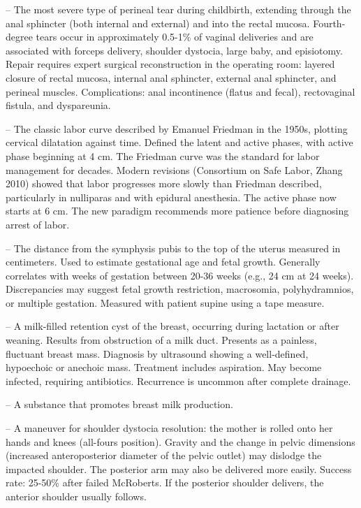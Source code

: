 -- The most severe type of perineal tear during childbirth, extending through the anal sphincter (both internal and external) and into the rectal mucosa. Fourth-degree tears occur in approximately 0.5-1\% of vaginal deliveries and are associated with forceps delivery, shoulder dystocia, large baby, and episiotomy. Repair requires expert surgical reconstruction in the operating room: layered closure of rectal mucosa, internal anal sphincter, external anal sphincter, and perineal muscles. Complications: anal incontinence (flatus and fecal), rectovaginal fistula, and dyspareunia.

-- The classic labor curve described by Emanuel Friedman in the 1950s, plotting cervical dilatation against time. Defined the latent and active phases, with active phase beginning at 4 cm. The Friedman curve was the standard for labor management for decades. Modern revisions (Consortium on Safe Labor, Zhang 2010) showed that labor progresses more slowly than Friedman described, particularly in nulliparas and with epidural anesthesia. The active phase now starts at 6 cm. The new paradigm recommends more patience before diagnosing arrest of labor.

-- The distance from the symphysis pubis to the top of the uterus measured in centimeters. Used to estimate gestational age and fetal growth. Generally correlates with weeks of gestation between 20-36 weeks (e.g., 24 cm at 24 weeks). Discrepancies may suggest fetal growth restriction, macrosomia, polyhydramnios, or multiple gestation. Measured with patient supine using a tape measure.

-- A milk-filled retention cyst of the breast, occurring during lactation or after weaning. Results from obstruction of a milk duct. Presents as a painless, fluctuant breast mass. Diagnosis by ultrasound showing a well-defined, hypoechoic or anechoic mass. Treatment includes aspiration. May become infected, requiring antibiotics. Recurrence is uncommon after complete drainage.

-- A substance that promotes breast milk production.

-- A maneuver for shoulder dystocia resolution: the mother is rolled onto her hands and knees (all-fours position). Gravity and the change in pelvic dimensions (increased anteroposterior diameter of the pelvic outlet) may dislodge the impacted shoulder. The posterior arm may also be delivered more easily. Success rate: 25-50\% after failed McRoberts. If the posterior shoulder delivers, the anterior shoulder usually follows.

